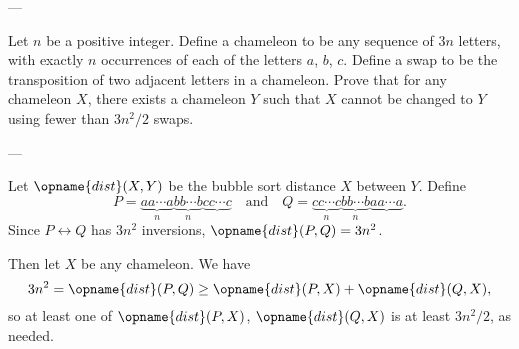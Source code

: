 
---

Let $n$ be a positive integer. Define a chameleon to be any sequence of $3n$ letters, with exactly $n$ occurrences of each of the letters $a$, $b$, $c$. Define a swap to be the transposition of two adjacent letters in a chameleon. Prove that for any chameleon $X$, there exists a chameleon $Y$ such that $X$ cannot be changed to $Y$ using fewer than $3n^2/2$ swaps.

---

Let $\opname{dist}(X,Y)$ be the bubble sort distance $X$ between $Y$. Define
\[P=\underbrace{aa\cdots a}_n\underbrace{bb\cdots b}_n\underbrace{cc\cdots c}\quad\text{and}\quad Q=\underbrace{cc\cdots c}_n\underbrace{bb\cdots b}_n\underbrace{aa\cdots a}.\]
Since $P\longleftrightarrow Q$ has $3n^2$ inversions, $\opname{dist}(P,Q)=3n^2$.

Then let $X$ be any chameleon. We have
\[3n^2=\opname{dist}(P,Q)\ge\opname{dist}(P,X)+\opname{dist}(Q,X),\]
so at least one of $\opname{dist}(P,X)$, $\opname{dist}(Q,X)$ is at least $3n^2/2$, as needed.

